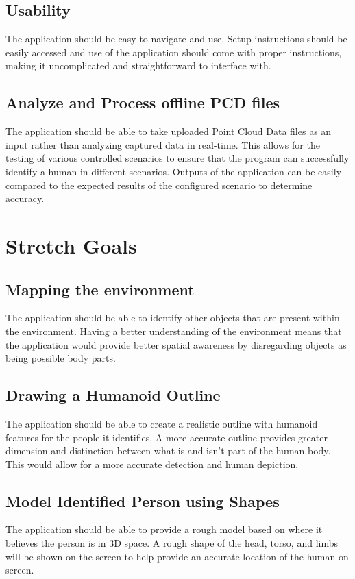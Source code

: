 \documentclass{article}
\begin{document}
\subsection{Usability}
The application should be easy to navigate and use. Setup instructions should be easily accessed and use of the application should come with proper instructions, making it uncomplicated and straightforward to interface with.

\subsection{Analyze and Process offline PCD files}
The application should be able to take uploaded Point Cloud Data files as an input rather than analyzing captured data in real-time. This allows for the testing of various controlled scenarios to ensure that the program can successfully identify a human in different scenarios. Outputs of the application can be easily compared to the expected results of the configured scenario to determine accuracy.
        
\newpage
\section{Stretch Goals}

\subsection{Mapping the environment}
The application should be able to identify other objects that are present within the environment. Having a better understanding of the environment means that the application would provide better spatial awareness by disregarding objects as being possible body parts.

\subsection{Drawing a Humanoid Outline}
The application should be able to create a realistic outline with humanoid features for the people it identifies. A more accurate outline provides greater dimension and distinction between what is and isn’t part of the human body. This would allow for a more accurate detection and human depiction.
  
\subsection{Model Identified Person using Shapes}
The application should be able to provide a rough model based on where it believes the person is in 3D space. A rough shape of the head, torso, and limbs will be shown on the screen to help provide an accurate location of the human on screen.
\end{document}
